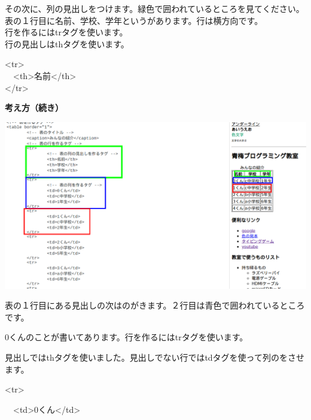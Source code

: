 \bigskip

その次に、列の見出しをつけます。緑色で囲われているところを見てください。\\
表の１行目に名前、学校、学年というがあります。行は横方向です。\\
行を作るにはtrタグを使います。\\
行の見出しはthタグを使います。\\


\bigskip

{\textless}tr{\textgreater}\\
\ \ {\textless}th{\textgreater}名前{\textless}/th{\textgreater}\\
{\textless}/tr{\textgreater}\\

\bigskip

\clearpage
\textbf{考え方（続き）}



\bigskip

\bigskip


\centering
\includegraphics[width=\textwidth]{text01-img/textbook-img191.png}

\flushleft

\bigskip

表の１行目にある見出しの次はのがきます。２行目は青色で囲われているところです。

0くんのことが書いてあります。行を作るにはtrタグを使います。

見出しではthタグを使いました。見出しでない行ではtdタグを使って列のをさせます。

{\textless}tr{\textgreater}

\ \ {\textless}td{\textgreater}0くん{\textless}/td{\textgreater}

